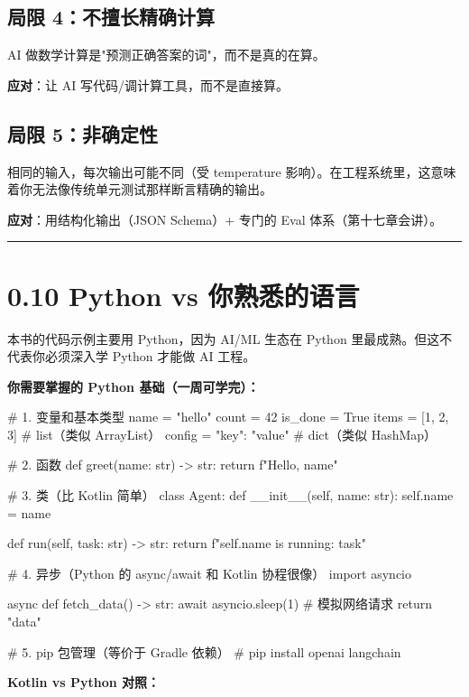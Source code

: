 \subsection{局限 4：不擅长精确计算}

AI 做数学计算是"预测正确答案的词"，而不是真的在算。


\textbf{应对}：让 AI 写代码/调计算工具，而不是直接算。


\subsection{局限 5：非确定性}

相同的输入，每次输出可能不同（受 temperature 影响）。在工程系统里，这意味着你无法像传统单元测试那样断言精确的输出。


\textbf{应对}：用结构化输出（JSON Schema）+ 专门的 Eval 体系（第十七章会讲）。


\bigskip\hrule\bigskip

\section{0.10 Python vs 你熟悉的语言}

本书的代码示例主要用 Python，因为 AI/ML 生态在 Python 里最成熟。但这不代表你必须深入学 Python 才能做 AI 工程。


\textbf{你需要掌握的 Python 基础（一周可学完）：}


\begin{codeblock}
# 1. 变量和基本类型
name = "hello"
count = 42
is_done = True
items = [1, 2, 3]          # list（类似 ArrayList）
config = {"key": "value"}  # dict（类似 HashMap）

# 2. 函数
def greet(name: str) -> str:
    return f"Hello, {name}"

# 3. 类（比 Kotlin 简单）
class Agent:
    def __init__(self, name: str):
        self.name = name

    def run(self, task: str) -> str:
        return f"{self.name} is running: {task}"

# 4. 异步（Python 的 async/await 和 Kotlin 协程很像）
import asyncio

async def fetch_data() -> str:
    await asyncio.sleep(1)  # 模拟网络请求
    return "data"

# 5. pip 包管理（等价于 Gradle 依赖）
# pip install openai langchain
\end{codeblock}

\textbf{Kotlin vs Python 对照：}


